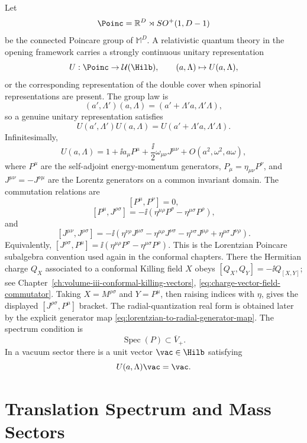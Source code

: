 \begin{definition}
\label{def:poincare-covariant-vacuum-hilbert-datum}
Let
\[
  \Poinc=\mathbb R^D\rtimes SO^+(1,D-1)
\]
be the connected Poincare group of \(\mathbb M^D\). A relativistic quantum
theory in the opening framework carries a strongly continuous unitary
representation
\[
  U:\Poinc\to\mathcal U(\Hilb),
  \qquad
  (a,\Lambda)\mapsto U(a,\Lambda),
\]
or the corresponding representation of the double cover when spinorial
representations are present.  The group law is
\[
  (a',\Lambda')(a,\Lambda)
  =
  (a'+\Lambda'a,\Lambda'\Lambda),
\]
so a genuine unitary representation satisfies
\[
  U(a',\Lambda')U(a,\Lambda)
  =
  U(a'+\Lambda'a,\Lambda'\Lambda).
\]
Infinitesimally,
\[
  U(a,\Lambda)
  =
  1+\ii a_\mu P^\mu+\frac{\ii}{2}\omega_{\mu\nu}J^{\mu\nu}
  +O(a^2,\omega^2,a\omega),
\]
where \(P^\mu\) are the self-adjoint energy-momentum generators,
\(P_\mu=\eta_{\mu\nu}P^\nu\), and
\(J^{\mu\nu}=-J^{\nu\mu}\) are the Lorentz generators on a common invariant
domain. The commutation relations are
\[
  [P^\mu,P^\nu]=0,
\]
\[
  [P^\mu,J^{\rho\sigma}]
  =
  -\ii(\eta^{\mu\rho}P^\sigma-\eta^{\mu\sigma}P^\rho),
\]
and
\[
  [J^{\mu\nu},J^{\rho\sigma}]
  =
  -\ii\left(
    \eta^{\nu\rho}J^{\mu\sigma}
    -\eta^{\mu\rho}J^{\nu\sigma}
    -\eta^{\nu\sigma}J^{\mu\rho}
    +\eta^{\mu\sigma}J^{\nu\rho}
  \right).
\]
Equivalently,
\([J^{\rho\sigma},P^\mu]
=\ii(\eta^{\mu\rho}P^\sigma-\eta^{\mu\sigma}P^\rho)\).
This is the Lorentzian Poincare subalgebra convention used again in the
conformal chapters.  There the Hermitian charge \(Q_X\) associated to a
conformal Killing field \(X\) obeys
\([Q_X,Q_Y]=-\ii Q_{[X,Y]}\); see
Chapter~\ref{ch:volume-iii-conformal-killing-vectors},
\eqref{eq:charge-vector-field-commutator}.  Taking
\(X=M^{\rho\sigma}\) and \(Y=P^\mu\), then raising indices with
\(\eta\), gives the displayed \([J^{\rho\sigma},P^\mu]\) bracket.  The
radial-quantization real form is obtained later by the explicit generator map
\eqref{eq:lorentzian-to-radial-generator-map}.
The spectrum condition is
\[
  \operatorname{Spec}(P)\subset\overline V_+.
\]
In a vacuum sector there is a unit vector \(\vac\in\Hilb\) satisfying
\[
  U(a,\Lambda)\vac=\vac .
\]
\end{definition}

\section{Translation Spectrum and Mass Sectors}

